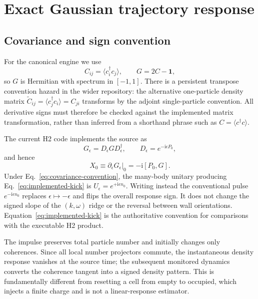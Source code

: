 \documentclass[aps,prb,onecolumn,nofootinbib,superscriptaddress]{revtex4-2}
\newcommand{\Id}{\mathbf{1}}
\newcommand{\ii}{\mathrm{i}}
\begin{document}
\section{Exact Gaussian trajectory response}
\label{sec:exact-tangent}

\subsection{Covariance and sign convention}

For the canonical engine we use
\begin{equation}
  C_{ij}=\langle c_i^\dagger c_j\rangle,
  \qquad G=2C-\Id,
  \label{eq:covariance-convention}
\end{equation}
so $G$ is Hermitian with spectrum in $[-1,1]$.  There is a persistent transpose
convention hazard in the wider repository: the alternative one-particle density
matrix $\widetilde C_{ij}=\langle c_j^\dagger c_i\rangle=C_{ji}$ transforms by
the adjoint single-particle convention.  All derivative signs must therefore be
checked against the implemented matrix transformation, rather than inferred
from a shorthand phrase such as $C=\langle c^\dagger c\rangle$.

The current H2 code implements the source as
\begin{equation}
  G_\epsilon=D_\epsilon G D_\epsilon^\dagger,
  \qquad D_\epsilon=e^{-\ii\epsilon P_0},
  \label{eq:implemented-kick}
\end{equation}
and hence
\begin{equation}
  X_0\equiv\left.\partial_\epsilon G_\epsilon\right|_0
  =-\ii[P_0,G].
  \label{eq:initial-tangent}
\end{equation}
Under Eq.~\eqref{eq:covariance-convention}, the many-body unitary producing
Eq.~\eqref{eq:implemented-kick} is $U_\epsilon=e^{+\ii\epsilon n_0}$.
Writing instead the conventional pulse $e^{-\ii\epsilon n_0}$ replaces
$\epsilon\mapsto-\epsilon$ and flips the overall response sign.  It does not
change the signed slope of the $(k,\omega)$ ridge or the reversal between wall
orientations.  Equation~\eqref{eq:implemented-kick} is the authoritative
convention for comparisons with the executable H2 product.

The impulse preserves total particle number and initially changes only
coherences.  Since all local number projectors commute, the instantaneous
density response vanishes at the source time; the subsequent monitored
dynamics converts the coherence tangent into a signed density pattern.  This
is fundamentally different from resetting a cell from empty to occupied,
which injects a finite charge and is not a linear-response estimator.
\end{document}
